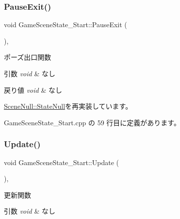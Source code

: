 \subsubsection{\texorpdfstring{Pause\+Exit()}{PauseExit()}}
{\footnotesize\ttfamily void Game\+Scene\+State\+\_\+\+Start\+::\+Pause\+Exit (\begin{DoxyParamCaption}{ }\end{DoxyParamCaption})\hspace{0.3cm}{\ttfamily [override]}, {\ttfamily [virtual]}}



ポーズ出口関数 


\begin{DoxyParams}{引数}
{\em void} & なし \\
\hline
\end{DoxyParams}

\begin{DoxyRetVals}{戻り値}
{\em void} & なし \\
\hline
\end{DoxyRetVals}


\mbox{\hyperlink{class_scene_null_1_1_state_null_acf2eecc6ee9f16b57095aa0b88192257}{Scene\+Null\+::\+State\+Null}}を再実装しています。



 Game\+Scene\+State\+\_\+\+Start.\+cpp の 59 行目に定義があります。

\mbox{\label{class_game_scene_state___start_ae11bb8d8ea9eae4fea2a9acf33dd1c8b}} 
\subsubsection{\texorpdfstring{Update()}{Update()}}
{\footnotesize\ttfamily void Game\+Scene\+State\+\_\+\+Start\+::\+Update (\begin{DoxyParamCaption}{ }\end{DoxyParamCaption})\hspace{0.3cm}{\ttfamily [override]}, {\ttfamily [virtual]}}



更新関数 


\begin{DoxyParams}{引数}
{\em void} & なし \\
\hline
\end{DoxyParams}

